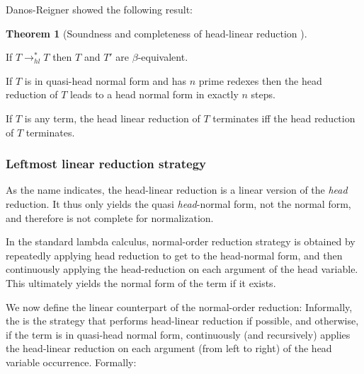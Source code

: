\documentclass{article}
\theoremstyle{definition}
\newtheorem{theorem}{Theorem}[section]
\begin{document}
Danos-Reigner showed the following result:
\begin{theorem}[Soundness and completeness of head-linear reduction \cite{danos-head}]
\label{thm:danosreigner_headlinred}
\begin{compactitem}
\item If $T \rightarrow^*_{hl} T$  then $T$ and $T'$ are $\beta$-equivalent.
\item If $T$ is in quasi-head normal form and has $n$ prime redexes then the head reduction of $T$ leads to a head normal form in exactly $n$ steps.
\item If $T$ is any term, the head linear reduction of $T$ terminates iff the head reduction of $T$ terminates.
\end{compactitem}
\end{theorem}

\subsubsection{Leftmost linear reduction strategy}

As the name indicates, the head-linear reduction is a linear version of the \emph{head} reduction. It thus only yields the quasi \emph{head}-normal form, not the normal form, and therefore is not complete for normalization.

In the standard lambda calculus, normal-order reduction strategy is obtained by repeatedly applying head reduction to get to the head-normal form, and then continuously applying the head-reduction on each argument of the head variable.
This ultimately yields the normal form of the term if it exists.

We now define the linear counterpart of the normal-order reduction: Informally, the  is the strategy that performs head-linear reduction if possible, and otherwise, if the term is in quasi-head normal form, continuously (and recursively) applies the head-linear reduction on each argument (from left to right) of the head variable occurrence.
Formally:
\end{document}
